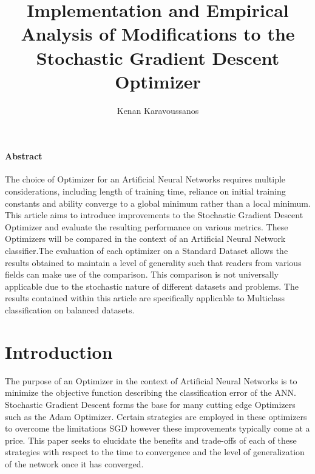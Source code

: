 \documentclass{article}
\title{Implementation and Empirical Analysis of Modifications to the Stochastic Gradient Descent Optimizer}
\author{Kenan Karavoussanos}
\begin{document}
\maketitle
\paragraph{Abstract}	
	
	The choice of Optimizer for an Artificial Neural Networks requires multiple considerations, including length of training time, reliance on initial training constants and ability converge to a global minimum rather than a local minimum. This article aims to introduce improvements to the Stochastic Gradient Descent Optimizer and evaluate the resulting performance on various metrics. These Optimizers will be compared in the context of an Artificial Neural Network classifier.The evaluation of each optimizer on a Standard Dataset allows the results obtained to maintain a level of generality such that readers from various fields can make use of the comparison. This comparison is not universally applicable due to the stochastic nature of different datasets and problems. The results contained within this article are specifically applicable to Multiclass classification on balanced datasets.
	

\tableofcontents

\section{Introduction}

	The purpose of an Optimizer in the context of Artificial Neural Networks is to minimize the objective function describing the classification error of the ANN. 
	Stochastic Gradient Descent forms the base for many cutting edge Optimizers such as the Adam Optimizer. Certain strategies are employed in these optimizers to overcome the limitations SGD however these improvements typically come at a price. This paper seeks to elucidate the benefits and trade-offs of each of these strategies with respect to the time to convergence and the level of generalization of the network once it has converged.   
\end{document}

